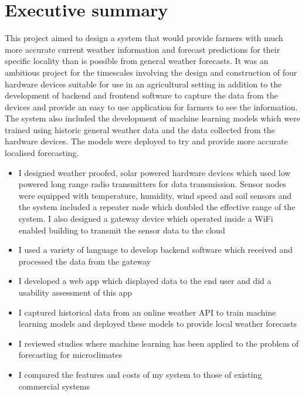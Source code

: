 \documentclass[11pt]{article}
\begin{document}




\section*{Executive summary}
This project aimed to design a system that would provide farmers with much more
accurate current weather information and forecast predictions for their specific
locality than is possible from general weather forecasts. It was an ambitious
project for the timescales involving the design and construction of four
hardware devices suitable for use in an agricultural setting in addition to the
development of backend and frontend software to capture the data from the
devices and provide an easy to use application for farmers to see the
information.  The system also included the development of machine learning
models which were trained using historic general weather data and the data
collected from the hardware devices.  The models were deployed to try and
provide more accurate localised forecasting.
\begin{itemize}
  \item I designed weather proofed, solar powered hardware devices which used
        low powered long range radio transmitters for data transmission.  Sensor
        nodes were equipped with temperature, humidity, wind speed and soil
        sensors and the system included a repeater node which doubled the
        effective range of the system. I also designed a gateway device which
        operated inside a WiFi enabled building to transmit the sensor data to
        the cloud
  \item I used a variety of language to develop backend software which received
        and processed the data from the gateway
  \item I developed a web app which displayed data to the end user and did a
        usability assessment of this app
  \item	I captured historical data from an online weather API to train machine
        learning models and deployed these models to provide local weather
        forecasts
  \item I reviewed studies where machine learning has been applied to the
        problem of forecasting for microclimates
  \item I compared the features and costs of my system to those of existing
        commercial systems
\end{itemize}
\end{document}
